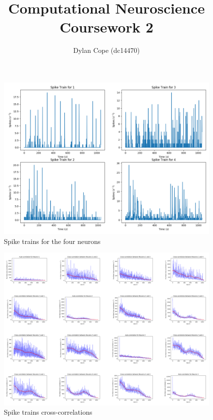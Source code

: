 \documentclass[12pt, a4paper]{article}
\title{Computational Neuroscience Coursework 2}
\author{Dylan Cope (dc14470)}
\date{}
\begin{document}
\nocite{*}


\maketitle

\begin{figure}[H]
  \centering
  \includegraphics[width=\linewidth]{../figures/spike_trains}
  \caption{Spike trains for the four neurons} \label{spike_trains}
\end{figure}


\begin{figure}[H]
  \centering
  \includegraphics[width=\linewidth]{../figures/correlations}
  \caption{Spike trains cross-correlations} \label{correlations}
\end{figure}
\end{document}
